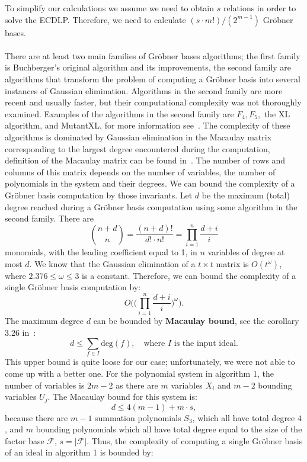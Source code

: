\documentclass[thesis=M,english]{FITthesis}[2012/10/20]
\theoremstyle{remark}
\theoremstyle{definition}
\begin{document}
\noindent To simplify our calculations we assume we need to obtain $s$ relations in order to solve the ECDLP. Therefore, we need to calculate $ (s\cdot m!)/(2^{m-1})$ Gröbner bases. \\
\\
\noindent There are at least two main families of Gröbner bases algorithms; the first family is Buchberger's original algorithm and its improvements, the second family are algorithms that transform the problem of computing a Gröbner basis into several instances of Gaussian elimination. Algorithms in the second family are more recent and usually faster, but their computational complexity was not thoroughly examined. Examples of the algorithms in the second family are $F_4, F_5,$ the XL algorithm, and MutantXL, for more information see~\cite{grobComp}. The complexity of these algorithms is dominated by Gaussian elimination in the Macaulay matrix corresponding to the largest degree encountered during the computation, definition of the Macaulay matrix can be found in~\cite{macal}. The number of rows and columns of this matrix depends on the number of variables, the number of polynomials in the system and their degrees. We can bound the complexity of a Gröbner basis computation by those invariants. Let $d$ be the maximum (total) degree reached during a Gröbner basis computation using some algorithm in the second family. There are 
$$
\binom{n+d}{n} = \frac{(n+d)!}{d!\cdot n!} = \prod_{i=1}^{n}\frac{d+i}{i}
$$
monomials, with the leading coefficient equal to 1, in $n$ variables of degree at most $d$. We know that the Gaussian elimination of a $t\times t$ matrix is $O(t^\omega)$, where $2.376 \leq \omega\leq 3$ is a constant. Therefore, we can bound the complexity of a single Gröbner basis computation by:
$$O\Bigg(\bigg(\prod_{i=1}^{n}\frac{d+i}{i}\bigg)^\omega\Bigg).$$
The maximum degree $d$ can be bounded by \textbf{Macaulay bound}, see the corollary 3.26 in~\cite{grobComp}: 
$$d\leq\sum_{f \in I}\text{deg}(f), \quad \text{where $I$ is the input ideal.}$$
This upper bound is quite loose for our case; unfortunately, we were not able to come up with a better one. For the polynomial system in algorithm 1, the number of variables is $2m-2$ as there are $m$ variables $X_i$ and $m-2$ bounding variables $U_j$. The Macaulay bound for this system is: 
$$
d \leq 4(m-1) + m\cdot s,
$$
because there are $m - 1$ summation polynomials $S_3$, which all have total degree $4$, and $m$ bounding polynomials which all have total degree equal to the size of the factor base $\mathcal{F}$, $s = |\mathcal{F}|$. Thus, the complexity of computing a single Gröbner basis of an ideal in algorithm 1 is bounded by:
\end{document}
